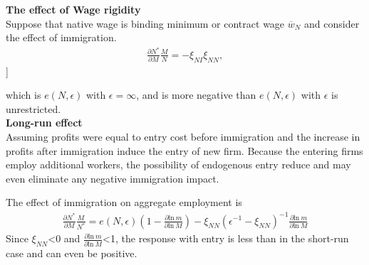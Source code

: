 \documentclass[../root]{subfiles}
\begin{document}
    {\bf The effect of Wage rigidity } \\
    Suppose that native wage is binding minimum or contract wage $\overline{w}_N$ and consider the effect of immigration.
    \begin{align*}
        \frac{\partial N^*}{\partial M}\frac{M}{N}= -\xi_{NI}\xi_{NN},
    \end{align*}]
    
    which is $e(N,\epsilon)$ with $\epsilon=\infty$, and is more negative than $e(N, \epsilon)$ with $\epsilon$ is unrestricted. \\
    
    {\bf Long-run effect} \\
    Assuming profits were equal to entry cost before immigration and the increase in profits  after immigration induce the entry of new firm.
    Because the entering firms employ additional workers, the possibility of endogenous entry reduce and may even eliminate any negative immigration impact.
    
    The effect of immigration on aggregate employment is
    \begin{align}
        \frac{\partial N^*}{\partial M} \frac{M}{N^*}=e(N,\epsilon)(1-\frac{\partial \mbox{ln} \ m}{\partial \mbox{ln} \ M})-\xi_{NN}(\epsilon^{-1}-\xi_{NN})^{-1}\frac{\partial \mbox{ln} \ m}{\partial \mbox{ln} \ M}
    \end{align}
    Since $\xi_{NN}$<0 and $\frac{\partial \mbox{ln} \ m}{\partial \mbox{ln} \ M}$<1, the response with entry is less than in the short-run case and can even be positive.
\end{document}
